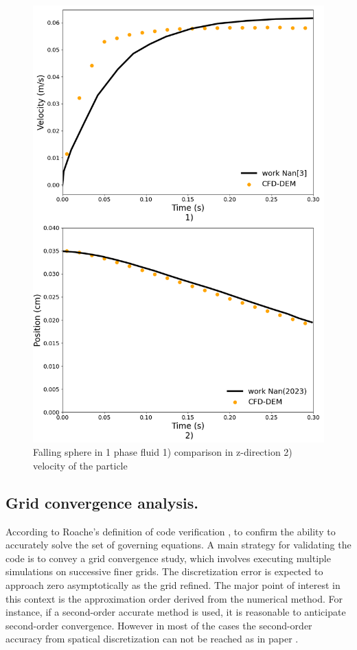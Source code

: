 \begin{figure}[!h]
    \centering
    \includegraphics[width=13cm]{GWU_Thesis_Sarmakeeva/Images/chap3/nan_simulation_192000_cells_dt_0_0005_simulation.png}
    \caption{Falling sphere in 1 phase fluid 1) comparison in z-direction 2) velocity of the particle}
    \label{fig:trajectory_1ph}
\end{figure}

\newpage

\subsection{Grid convergence analysis.}

According to Roache's definition of code verification \cite{roache1998verification}, to confirm the ability to accurately solve the set of governing equations. A main strategy for validating the code is to convey a grid convergence study, which involves executing multiple simulations on successive finer grids. The discretization error is expected to approach zero asymptotically as the grid refined. The major point of interest in this context is the approximation order derived from the numerical method. For instance, if a second-order accurate method is used, it is reasonable to anticipate second-order convergence. However in most of the cases the second-order accuracy from spatical discretization can not be reached as in paper \cite{taira2007immersed}.

